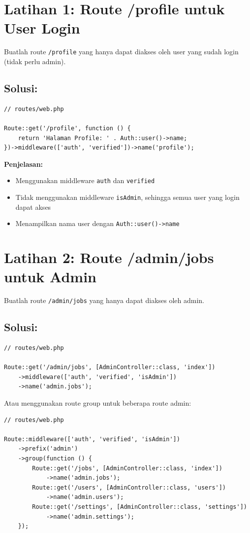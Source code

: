 \documentclass[a4paper,oneside,11pt]{book}
\begin{document}
\section{Latihan 1: Route /profile untuk User Login}

Buatlah route \texttt{/profile} yang hanya dapat diakses oleh user yang sudah login (tidak perlu admin).

\subsection{Solusi:}

\begin{lstlisting}[style=phpstyle]
// routes/web.php

Route::get('/profile', function () {
    return 'Halaman Profile: ' . Auth::user()->name;
})->middleware(['auth', 'verified'])->name('profile');
\end{lstlisting}

\textbf{Penjelasan:}
\begin{itemize}
    \item Menggunakan middleware \texttt{auth} dan \texttt{verified}
    \item Tidak menggunakan middleware \texttt{isAdmin}, sehingga semua user yang login dapat akses
    \item Menampilkan nama user dengan \texttt{Auth::user()->name}
\end{itemize}

\section{Latihan 2: Route /admin/jobs untuk Admin}

Buatlah route \texttt{/admin/jobs} yang hanya dapat diakses oleh admin.

\subsection{Solusi:}

\begin{lstlisting}[style=phpstyle]
// routes/web.php

Route::get('/admin/jobs', [AdminController::class, 'index'])
    ->middleware(['auth', 'verified', 'isAdmin'])
    ->name('admin.jobs');
\end{lstlisting}

Atau menggunakan route group untuk beberapa route admin:

\begin{lstlisting}[style=phpstyle]
// routes/web.php

Route::middleware(['auth', 'verified', 'isAdmin'])
    ->prefix('admin')
    ->group(function () {
        Route::get('/jobs', [AdminController::class, 'index'])
            ->name('admin.jobs');
        Route::get('/users', [AdminController::class, 'users'])
            ->name('admin.users');
        Route::get('/settings', [AdminController::class, 'settings'])
            ->name('admin.settings');
    });
\end{lstlisting}
\end{document}
